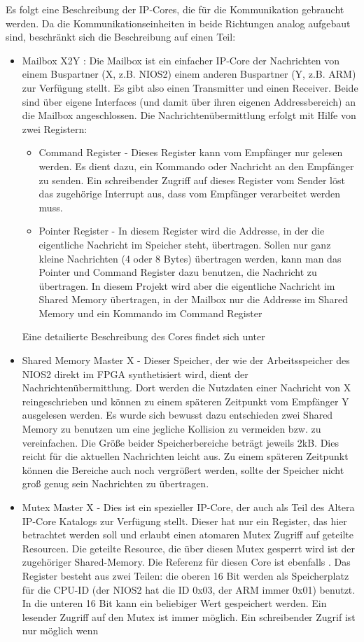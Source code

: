 Es folgt eine Beschreibung der \ac{IP}-Cores, die für die Kommunikation gebraucht werden. Da die Kommunikationseinheiten in beide Richtungen analog aufgebaut sind, beschränkt sich die Beschreibung auf einen Teil:
\begin{itemize}
	\item Mailbox X2Y : Die Mailbox ist ein einfacher IP-Core der Nachrichten von einem Buspartner (X, z.B. NIOS2) einem anderen Buspartner (Y, z.B. ARM) zur Verfügung stellt. Es gibt also einen Transmitter und einen Receiver. Beide sind über eigene Interfaces (und damit über ihren eigenen Addressbereich) an die Mailbox angeschlossen. Die Nachrichtenübermittlung erfolgt mit Hilfe von zwei Registern:
	\begin{itemize}
		\item Command Register - Dieses Register kann vom Empfänger nur gelesen werden. Es dient dazu, ein Kommando oder Nachricht an den Empfänger zu senden. Ein schreibender Zugriff auf dieses Register vom Sender löst das zugehörige Interrupt aus, dass vom Empfänger verarbeitet werden muss.
		\item Pointer Register - In diesem Register wird die Addresse, in der die eigentliche Nachricht im Speicher steht, übertragen. Sollen nur ganz kleine Nachrichten (4 oder 8 Bytes) übertragen werden, kann man das Pointer und Command Register dazu benutzen, die Nachricht zu übertragen. In diesem Projekt wird aber die eigentliche Nachricht im Shared Memory übertragen, in der Mailbox nur die Addresse im Shared Memory und ein Kommando im Command Register
	\end{itemize}
	Eine detailierte Beschreibung des Cores findet sich unter \cite[470ff]{embedded_guide}
	\item Shared Memory Master X - Dieser Speicher, der wie der Arbeitsspeicher des NIOS2 direkt im \ac{FPGA} synthetisiert wird, dient der Nachrichtenübermittlung. Dort werden die Nutzdaten einer Nachricht von X reingeschrieben und können zu einem späteren Zeitpunkt vom Empfänger Y ausgelesen werden. Es wurde sich bewusst dazu entschieden zwei Shared Memory zu benutzen um eine jegliche Kollision zu vermeiden bzw. zu vereinfachen. Die Größe beider Speicherbereiche beträgt jeweils 2kB. Dies reicht für die aktuellen Nachrichten leicht aus. Zu einem späteren Zeitpunkt können die Bereiche auch noch vergrößert werden, sollte der Speicher nicht groß genug sein Nachrichten zu übertragen.
	\item Mutex Master X - Dies ist ein spezieller \ac{IP}-Core, der auch als Teil des Altera \ac{IP}-Core Katalogs zur Verfügung stellt. Dieser hat nur ein Register, das hier betrachtet werden soll und erlaubt einen atomaren Mutex Zugriff auf geteilte Resourcen. Die geteilte Resource, die über diesen Mutex gesperrt wird ist der zugehöriger Shared-Memory. Die Referenz für diesen Core ist ebenfalls \cite[319ff]{embedded_guide}. Das Register besteht aus zwei Teilen: die oberen 16 Bit werden als Speicherplatz für die CPU-ID (der NIOS2 hat die ID 0x03, der ARM immer 0x01) benutzt. In die unteren 16 Bit kann ein beliebiger Wert gespeichert werden. Ein lesender Zugriff auf den Mutex ist immer möglich. Ein schreibender Zugrif ist nur möglich wenn

\end{itemize}
